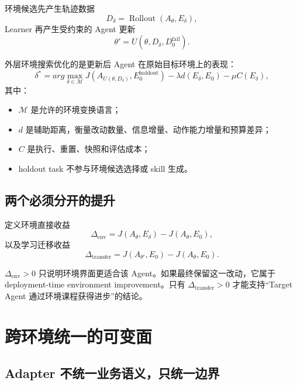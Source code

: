 \documentclass[11pt,a4paper,fontset=fandol]{ctexart}
\newcommand{\Etarget}{E_0}
\newcommand{\Echild}{E_{\delta}}
\newcommand{\Agent}{A_{\theta}}
\newcommand{\Agentnew}{A_{\theta'}}
\begin{document}
环境候选先产生轨迹数据
\begin{equation}
D_{\delta}=\operatorname{Rollout}(\Agent,\Echild),
\end{equation}
Learner 再产生受约束的 Agent 更新
\begin{equation}
\theta'=U(\theta,D_{\delta},D_{0}^{\mathrm{fail}}).
\end{equation}

外层环境搜索优化的是更新后 Agent 在原始目标环境上的表现：
\begin{equation}
\delta^*=arg\max_{\delta\in\mathcal{M}}
J\!\left(A_{U(\theta,D_{\delta})},\Etarget^{\mathrm{holdout}}\right)
-\lambda d(\Echild,\Etarget)
-\mu C(\Echild),
\label{eq:outer}
\end{equation}
其中：

\begin{itemize}
  \item $\mathcal{M}$ 是允许的环境变换语言；
  \item $d$ 是辅助距离，衡量改动数量、信息增量、动作能力增量和预算差异；
  \item $C$ 是执行、重置、快照和评估成本；
  \item holdout task 不参与环境候选选择或 skill 生成。
\end{itemize}

\subsection{两个必须分开的提升}

定义环境直接收益
\begin{equation}
\Delta_{\mathrm{env}}
=J(\Agent,\Echild)-J(\Agent,\Etarget),
\end{equation}
以及学习迁移收益
\begin{equation}
\Delta_{\mathrm{transfer}}
=J(\Agentnew,\Etarget)-J(\Agent,\Etarget).
\end{equation}

$\Delta_{\mathrm{env}}>0$ 只说明环境界面更适合该 Agent。如果最终保留这一改动，它属于 deployment-time environment improvement。只有 $\Delta_{\mathrm{transfer}}>0$ 才能支持“Target Agent 通过环境课程获得进步”的结论。

\section{跨环境统一的可变面}

\subsection{Adapter 不统一业务语义，只统一边界}
\end{document}
